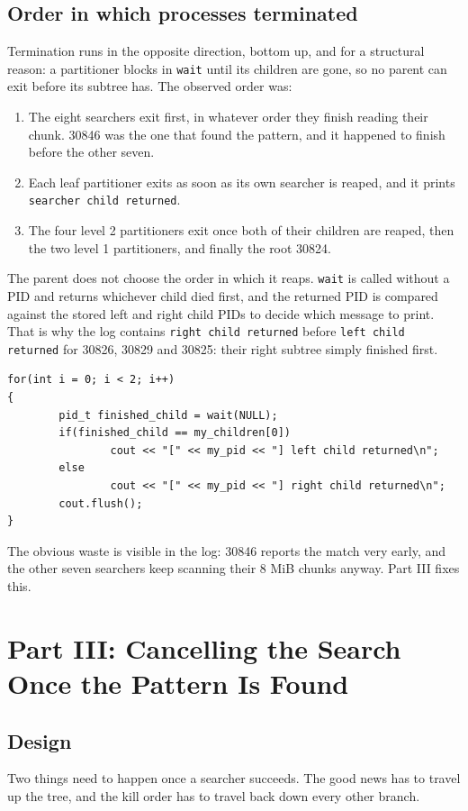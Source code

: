 \documentclass[11pt]{article}
\begin{document}
\subsection*{Order in which processes terminated}
Termination runs in the opposite direction, bottom up, and for a structural reason:
a partitioner blocks in \texttt{wait} until its children are gone, so no parent can
exit before its subtree has. The observed order was:

\begin{enumerate}
	\item The eight searchers exit first, in whatever order they finish reading
	their chunk. 30846 was the one that found the pattern, and it happened to
	finish before the other seven.
	\item Each leaf partitioner exits as soon as its own searcher is reaped, and it prints
	\texttt{searcher child returned}.
	\item The four level 2 partitioners exit once both of their children are reaped,
	then the two level 1 partitioners, and finally the root 30824.
\end{enumerate}

The parent does not choose the order in which it reaps. \texttt{wait} is called
without a PID and returns whichever child died first, and the returned PID is
compared against the stored left and right child PIDs to decide which message to
print. That is why the log contains \texttt{right child returned} before
\texttt{left child returned} for 30826, 30829 and 30825: their right subtree simply
finished first.

\begin{lstlisting}
for(int i = 0; i < 2; i++)
{
        pid_t finished_child = wait(NULL);
        if(finished_child == my_children[0])
                cout << "[" << my_pid << "] left child returned\n";
        else
                cout << "[" << my_pid << "] right child returned\n";
        cout.flush();
}
\end{lstlisting}

The obvious waste is visible in the log: 30846 reports the match very early, and
the other seven searchers keep scanning their 8 MiB chunks anyway. Part III fixes
this.

\section*{Part III: Cancelling the Search Once the Pattern Is Found}

\subsection*{Design}
Two things need to happen once a searcher succeeds. The good news has to travel up
the tree, and the kill order has to travel back down every other branch.
\end{document}
